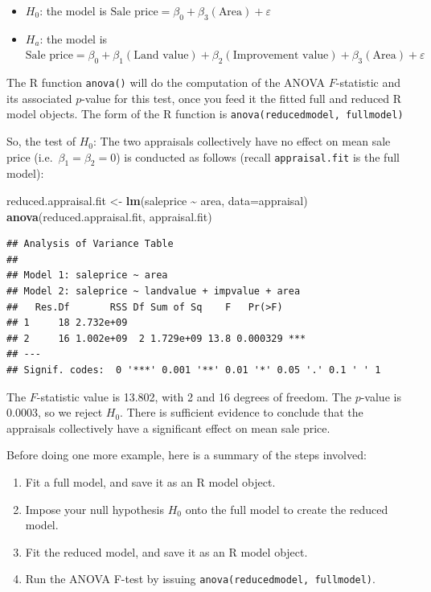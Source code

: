 \documentclass[
]{book}
\newenvironment{Shaded}{\begin{snugshade}}{\end{snugshade}}
\newcommand{\AttributeTok}[1]{\textcolor[rgb]{0.13,0.29,0.53}{#1}}
\newcommand{\FunctionTok}[1]{\textcolor[rgb]{0.13,0.29,0.53}{\textbf{#1}}}
\newcommand{\NormalTok}[1]{#1}
\newcommand{\OtherTok}[1]{\textcolor[rgb]{0.56,0.35,0.01}{#1}}
\newcommand{\SpecialCharTok}[1]{\textcolor[rgb]{0.81,0.36,0.00}{\textbf{#1}}}
\providecommand{\tightlist}{%
  \setlength{\itemsep}{0pt}\setlength{\parskip}{0pt}}
\begin{document}
\begin{itemize}
\tightlist
\item
  \(H_0\): the model is \(\textrm{Sale price} = \beta_0 + \beta_3(\textrm{Area}) + \varepsilon\)
\item
  \(H_a\): the model is \(\textrm{Sale price} = \beta_0 + \beta_1(\textrm{Land value}) + \beta_2(\textrm{Improvement value}) + \beta_3(\textrm{Area}) + \varepsilon\)
\end{itemize}

The R function \texttt{anova()} will do the computation of the ANOVA \(F\)-statistic and its associated \(p\)-value for this test, once you feed it the fitted full and reduced R model objects. The form of the R function is \texttt{anova(reducedmodel,\ fullmodel)}

So, the test of \(H_0\): The two appraisals collectively have no effect on mean sale price (i.e.~\(\beta_1 = \beta_2 = 0\)) is conducted as follows (recall \texttt{appraisal.fit} is the full model):

\begin{Shaded}
\begin{Highlighting}[]
\NormalTok{reduced.appraisal.fit }\OtherTok{\textless{}{-}} \FunctionTok{lm}\NormalTok{(saleprice }\SpecialCharTok{\textasciitilde{}}\NormalTok{ area, }\AttributeTok{data=}\NormalTok{appraisal)}
\FunctionTok{anova}\NormalTok{(reduced.appraisal.fit, appraisal.fit)}
\end{Highlighting}
\end{Shaded}

\begin{verbatim}
## Analysis of Variance Table
## 
## Model 1: saleprice ~ area
## Model 2: saleprice ~ landvalue + impvalue + area
##   Res.Df       RSS Df Sum of Sq    F   Pr(>F)    
## 1     18 2.732e+09                               
## 2     16 1.002e+09  2 1.729e+09 13.8 0.000329 ***
## ---
## Signif. codes:  0 '***' 0.001 '**' 0.01 '*' 0.05 '.' 0.1 ' ' 1
\end{verbatim}

The \(F\)-statistic value is 13.802, with 2 and 16 degrees of freedom. The \(p\)-value is 0.0003, so we reject \(H_0\). There is sufficient evidence to conclude that the appraisals collectively have a significant effect on mean sale price.

Before doing one more example, here is a summary of the steps involved:

\begin{enumerate}
\def\labelenumi{\arabic{enumi}.}
\tightlist
\item
  Fit a full model, and save it as an R model object.
\item
  Impose your null hypothesis \(H_0\) onto the full model to create the reduced model.
\item
  Fit the reduced model, and save it as an R model object.
\item
  Run the ANOVA F-test by issuing \texttt{anova(reducedmodel,\ fullmodel)}.
\end{enumerate}
\end{document}
